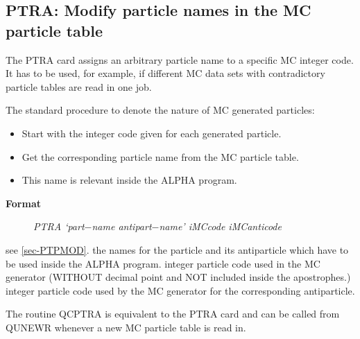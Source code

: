 \subsection{\label{sec-PTPTRA}PTRA: Modify particle names in the
MC particle table}
\par
The PTRA card assigns an arbitrary particle name to a
specific MC integer code.
It has to be used, for example, if different MC
data sets with contradictory particle tables are read in one job.
\par
The standard procedure to denote the nature of MC generated particles:
\begin{itemize}
\item Start with the integer code given for each generated particle.
\item Get the corresponding particle name from the MC particle table.
\item This name is relevant inside the ALPHA program.
\end{itemize}
\begin{description}\item[\bf{Format
}]{\it PTRA `part$-$name antipart$-$name' iMCcode iMCanticode}
\end{description}
\begin{indentlist}{ 3.75cm}{ 4.00cm}
see \ref{sec-PTPMOD}.
the names for the particle and its antiparticle
which have to be used inside the ALPHA program.
integer particle code used in the MC generator
(WITHOUT decimal point and NOT included inside the apostrophes.)
integer particle code used by the MC
generator for the corresponding antiparticle.
\end{indentlist}
The routine QCPTRA is equivalent to the PTRA card and can be called
from QUNEWR whenever a new MC particle table is read in.
